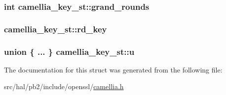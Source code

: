 \subsubsection[{\texorpdfstring{grand\+\_\+rounds}{grand_rounds}}]{\setlength{\rightskip}{0pt plus 5cm}int camellia\+\_\+key\+\_\+st\+::grand\+\_\+rounds}\hypertarget{structcamellia__key__st_ae0eb815e40c45d92126984b6645a7d96}{}\label{structcamellia__key__st_ae0eb815e40c45d92126984b6645a7d96}
\subsubsection[{\texorpdfstring{rd\+\_\+key}{rd_key}}]{ camellia\+\_\+key\+\_\+st\+::rd\+\_\+key}\hypertarget{structcamellia__key__st_a53f172c0118d018005c65e5c064f5587}{}\label{structcamellia__key__st_a53f172c0118d018005c65e5c064f5587}
\subsubsection[{\texorpdfstring{u}{u}}]{\setlength{\rightskip}{0pt plus 5cm}union \{ ... \}   camellia\+\_\+key\+\_\+st\+::u}\hypertarget{structcamellia__key__st_ae89f5c623cdae8e9288ff1392cd3e60d}{}\label{structcamellia__key__st_ae89f5c623cdae8e9288ff1392cd3e60d}


The documentation for this struct was generated from the following file\+:\begin{DoxyCompactItemize}
\item 
src/hal/pb2/include/openssl/\hyperlink{camellia_8h}{camellia.\+h}\end{DoxyCompactItemize}
